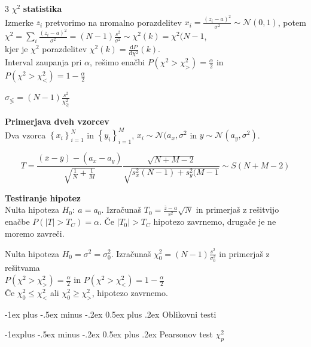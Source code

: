 \documentclass[10pt,landscape]{article}
\makeatletter
\renewcommand{\section}{\@startsection{section}{1}{0mm}%
	{-1ex plus -.5ex minus -.2ex}%
	{0.5ex plus .2ex}%
	{\normalfont\large\bfseries}}
\renewcommand{\subsection}{\@startsection{subsection}{2}{0mm}%
	{-1explus -.5ex minus -.2ex}%
	{0.5ex plus .2ex}%
	{\normalfont\normalsize\bfseries}}
\theoremstyle{definition}
\makeatother
\begin{document}
\begin{multicols}{3}
  \( \chi ^2 \) \textbf{statistika} \\
  Izmerke \( z_i \) pretvorimo na nromalno porazdelitev \( x_i = \frac{\left( z_i - a \right) ^2}{\sigma ^2} \sim \mathcal{N} (0, 1) \), potem \\
  \( \chi ^2 = \sum\limits_i^{} \frac{\left( z_i - a \right) ^2}{\sigma ^2} = (N - 1) \frac{s ^2}{\sigma ^2} \sim \chi ^2 (k) = \chi ^2 (N - 1 \), \\
  kjer je \( \chi ^2 \) porazdelitev \( \chi ^2 (k) = \frac{\mathrm{d} P}{\mathrm{d} \chi ^2 }(k) \). \\
  Interval zaupanja pri \( \alpha \), rešimo enačbi \( P \left( \chi ^2 > \chi_{>} ^2 \right) = \frac{\alpha}{2} \) in \( P \left( \chi ^2 > \chi_{<} ^2 \right) = 1 - \frac{\alpha}{2} \)

  \( \sigma_{\lessgtr} = (N - 1) \frac{s ^2}{\chi ^2_{\gtrless}} \)

  \textbf{Primerjava dveh vzorcev} \\
  Dva vzorca \( \left\{ x_i \right\}_{i = 1}^N \) in \( \left\{ y_i \right\}_{i = 1}^M \), \( x_i \sim \mathcal{N} (a_x, \sigma ^2 \) in \( y\sim \mathcal{N} ( a_y, \sigma ^2 ) \). 

  \[ T = \frac{\left( \bar{x} - \bar{y} \right) - \left( a_x - a_y \right)}{\sqrt{\frac{1}{N} + \frac{1}{M}}} \frac{\sqrt{N + M - 2}}{\sqrt{s_x ^2 (N - 1) + s_y ^2 (M - 1}} \sim S (N + M - 2) 
  \]

  \textbf{Testiranje hipotez}\\
  Nulta hipoteza \( H_0: \ a = a_0 \). Izračunaš \( T_0 = \frac{\bar{z} - a}{s ^2} \sqrt{N} \) in primerjaš z rešitvijo enačbe \( P \left( \left| T \right| > T_C \right) = \alpha \). Če \( \left| T_0 \right| > T_C \) hipotezo zavrnemo, drugače je ne moremo zavreči.

  Nulta hipoteza \( H_0 = \sigma ^2 = \sigma ^2_0 \). Izračunaš \( \chi_0 ^2 = (N - 1) \frac{s ^2}{\sigma_0 ^2} \) in primerjaš z rešitvama \\
  \( P \left( \chi ^2 > \chi_{>} ^2 \right) = \frac{\alpha}{2} \) in \( P \left( \chi ^2 > \chi_{<} ^2 \right) = 1 - \frac{\alpha}{2} \)\\
  Če \( \chi_0 ^2 \le \chi_{<} ^2 \) ali \( \chi_0 ^2 \ge \chi_{>} ^2 \), hipotezo zavrnemo. 

  \section{Oblikovni testi}

  \subsection{Pearsonov test \( \chi_p ^2 \)}


\end{multicols}
\end{document}
